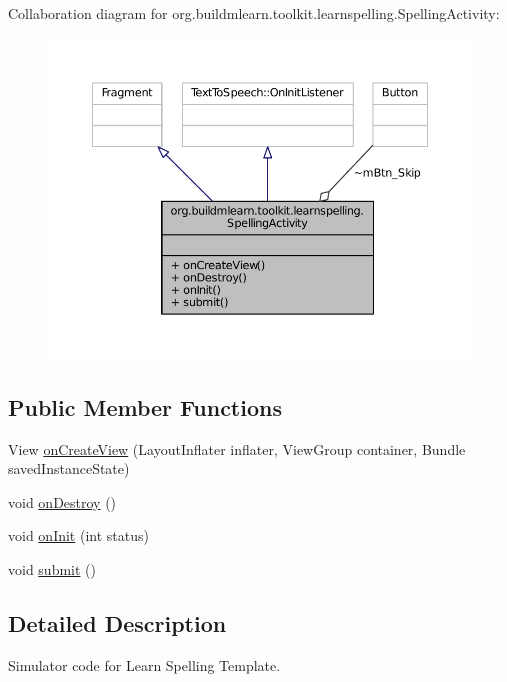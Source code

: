 Collaboration diagram for org.\-buildmlearn.\-toolkit.\-learnspelling.\-Spelling\-Activity\-:
\nopagebreak
\begin{figure}[H]
\begin{center}
\leavevmode
\includegraphics[width=350pt]{df/dd6/classorg_1_1buildmlearn_1_1toolkit_1_1learnspelling_1_1SpellingActivity__coll__graph}
\end{center}
\end{figure}
\subsection*{Public Member Functions}
\begin{DoxyCompactItemize}
\item 
View \hyperlink{classorg_1_1buildmlearn_1_1toolkit_1_1learnspelling_1_1SpellingActivity_a49e2bfcf6bfd1b88d792116273dc6b0b}{on\-Create\-View} (Layout\-Inflater inflater, View\-Group container, Bundle saved\-Instance\-State)
\item 
void \hyperlink{classorg_1_1buildmlearn_1_1toolkit_1_1learnspelling_1_1SpellingActivity_a733cf45defffb845f8537d561c78c066}{on\-Destroy} ()
\item 
void \hyperlink{classorg_1_1buildmlearn_1_1toolkit_1_1learnspelling_1_1SpellingActivity_a3b7204b92129f62ba713292e933fc738}{on\-Init} (int status)
\item 
void \hyperlink{classorg_1_1buildmlearn_1_1toolkit_1_1learnspelling_1_1SpellingActivity_a343f93e211750af42f3a5c147f93e03e}{submit} ()
\end{DoxyCompactItemize}


\subsection{Detailed Description}
Simulator code for Learn Spelling Template. 

